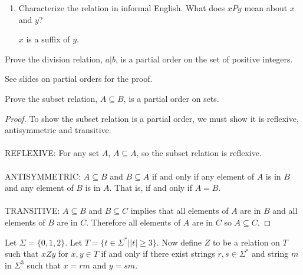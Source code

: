 \documentclass[]{exam}
\theoremstyle{definition}
\begin{document}
\begin{questions}
\begin{enumerate}[label=\alph*)]
\item Characterize the relation in informal English. What does $xPy$ mean about $x$
and $y$?\\
\begin{solution}
$x$ is a suffix of $y$.
\end{solution}

\end{enumerate}
\question Prove the division relation, $a | b$, is a partial order on the set
of positive integers. 
\begin{solution}
See slides on partial orders for the proof.
\end{solution}

\question Prove the subset relation, $A \subseteq B$, is a partial order on
sets. 
\begin{solution}
\begin{proof}
To show the subset relation is a partial order, we must show it is reflexive, 
antisymmetric and transitive.
\\~\\
REFLEXIVE: For any set $A$, $A \subseteq A$, so the subset relation is
reflexive.
\\~\\
ANTISYMMETRIC: $A \subseteq B$ and $B \subseteq A$ if and only if any element
of $A$ is in $B$ and any element of $B$ is in $A$. That is, if and only if 
$A = B$. 
\\~\\
TRANSITIVE: $A \subseteq B$ and $B \subseteq C$ implies that all elements of $A$
are in $B$ and all elements of $B$ are in $C$. Therefore all elements of $A$ are
in $C$ so $A \subseteq C$.
\end{proof}
\end{solution}

\question 
Let $\Sigma = \{0,1,2\}$.  Let $T = \{t \in \Sigma^* | |t| \geq 3\}$.
Now define $Z$ to be a relation on $T$ such that $xZy$ for $x,y \in
T$ if and only if there exist strings $r,s \in \Sigma^*$
and string $m$ in $\Sigma^3$ such that $x = rm$ and $y = sm$. 


\end{questions}
\end{document}
